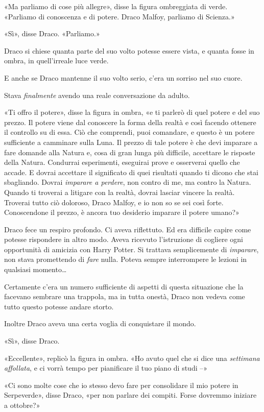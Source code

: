«Ma parliamo di cose più allegre», disse la figura ombreggiata di verde. «Parliamo di conoscenza e di potere. Draco Malfoy, parliamo di Scienza.»

«Sì», disse Draco. «Parliamo.»

Draco si chiese quanta parte del suo volto potesse essere vista, e quanta fosse in ombra, in quell’irreale luce verde.

E anche se Draco mantenne il suo volto serio, c’era un sorriso nel suo cuore.

Stava \textit{finalmente} avendo una reale conversazione da adulto.

«Ti offro il potere», disse la figura in ombra, «e ti parlerò di quel potere e del suo prezzo. Il potere viene dal conoscere la forma della realtà e così facendo ottenere il controllo su di essa. Ciò che comprendi, puoi comandare, e questo è un potere sufficiente a camminare sulla Luna. Il prezzo di tale potere è che devi imparare a fare domande alla Natura e, cosa di gran lunga più difficile, accettare le risposte della Natura. Condurrai esperimenti, eseguirai prove e osserverai quello che accade. E dovrai accettare il significato di quei risultati quando ti dicono che stai sbagliando. Dovrai \textit{imparare a perdere}, non contro di me, ma contro la Natura. Quando ti troverai a litigare con la realtà, dovrai lasciar vincere la realtà. Troverai tutto ciò doloroso, Draco Malfoy, e io non so se sei così forte. Conoscendone il prezzo, è ancora tuo desiderio imparare il potere umano?»

Draco fece un respiro profondo. Ci aveva riflettuto. Ed era difficile capire come potesse rispondere in altro modo. Aveva ricevuto l’istruzione di cogliere ogni opportunità di amicizia con Harry Potter. Si trattava semplicemente di \textit{imparare}, non stava promettendo di \textit{fare} nulla. Poteva sempre interrompere le lezioni in qualsiasi momento…

Certamente c’era un numero sufficiente di aspetti di questa situazione che la facevano sembrare una trappola, ma in tutta onestà, Draco non vedeva come tutto questo potesse andare storto.

Inoltre Draco aveva una certa voglia di conquistare il mondo.

«Sì», disse Draco.

«Eccellente», replicò la figura in ombra. «Ho avuto quel che si dice una \textit{settimana affollata}, e ci vorrà tempo per pianificare il tuo piano di studi –»

«Ci sono molte cose che io stesso devo fare per consolidare il mio potere in Serpeverde», disse Draco, «per non parlare dei compiti. Forse dovremmo iniziare a ottobre?»

